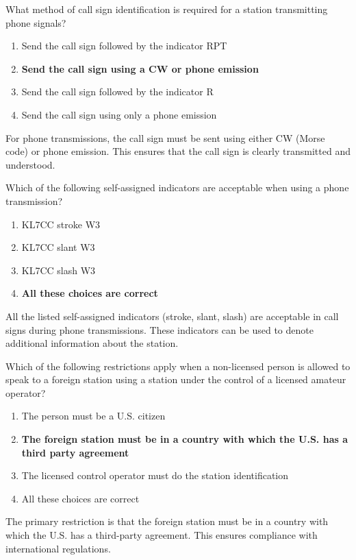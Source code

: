 
\begin{tcolorbox}[colback=gray!10!white,colframe=black!75!black,title={T1F05}]
    What method of call sign identification is required for a station transmitting phone signals?
    \begin{enumerate}[label=\Alph*,noitemsep]
        \item Send the call sign followed by the indicator RPT
        \item \textbf{Send the call sign using a CW or phone emission}
        \item Send the call sign followed by the indicator R
        \item Send the call sign using only a phone emission
    \end{enumerate}
\end{tcolorbox}
For phone transmissions, the call sign must be sent using either CW (Morse code) or phone emission. This ensures that the call sign is clearly transmitted and understood.


\begin{tcolorbox}[colback=gray!10!white,colframe=black!75!black,title={T1F06}]
    Which of the following self-assigned indicators are acceptable when using a phone transmission?
    \begin{enumerate}[label=\Alph*,noitemsep]
        \item KL7CC stroke W3
        \item KL7CC slant W3
        \item KL7CC slash W3
        \item \textbf{All these choices are correct}
    \end{enumerate}
\end{tcolorbox}
All the listed self-assigned indicators (stroke, slant, slash) are acceptable in call signs during phone transmissions. These indicators can be used to denote additional information about the station.


\begin{tcolorbox}[colback=gray!10!white,colframe=black!75!black,title={T1F07}]
    Which of the following restrictions apply when a non-licensed person is allowed to speak to a foreign station using a station under the control of a licensed amateur operator?
    \begin{enumerate}[label=\Alph*,noitemsep]
        \item The person must be a U.S. citizen
        \item \textbf{The foreign station must be in a country with which the U.S. has a third party agreement}
        \item The licensed control operator must do the station identification
        \item All these choices are correct
    \end{enumerate}
\end{tcolorbox}
The primary restriction is that the foreign station must be in a country with which the U.S. has a third-party agreement. This ensures compliance with international regulations.

